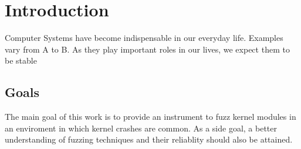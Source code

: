 \section{Introduction}


Computer Systems have become indispensable in our everyday life. Examples vary 
from A to B. As they play important roles in our lives, we expect them to be 
stable


\subsection{Goals}


The main goal of this work is to provide an instrument to fuzz kernel modules
in an enviroment in which kernel crashes are common. As a side goal, a better 
understanding of fuzzing techniques and their reliablity should also be attained.